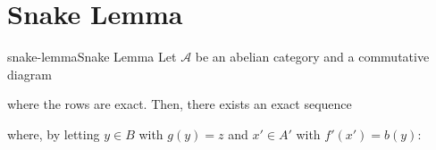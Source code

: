\documentclass[preview]{standalone}
\begin{document}
\genpage

\section{Snake Lemma}

\begin{snippettheorem}{snake-lemma}{Snake Lemma}
    Let \(\mathcal A\) be an abelian category
    and a commutative diagram
    \begin{center}
    \end{center}
    where the rows are exact.
    Then, there exists an exact sequence
    \begin{center}
    \end{center}
    where, by letting \(y \in B\) with \(g(y) = z\) and \(x'\in A'\) with \(f'(x') = b(y)\):

\end{snippettheorem}
\end{document}
